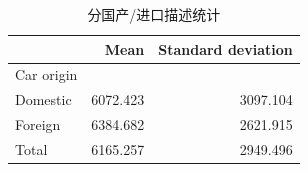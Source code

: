 \begin{table}[htbp]
  \centering
  \caption{ 分国产/进口描述统计 }
  \label{tab:statby}
  \small
  \begin{tabular}{lll}
    \toprule
    \multicolumn{1}{c}{} &
      \multicolumn{1}{r}{Mean} &
      \multicolumn{1}{r}{Standard deviation} \\
    \midrule
    \multicolumn{1}{l}{Car origin} &
      \multicolumn{1}{r}{} &
      \multicolumn{1}{r}{} \\
    \multicolumn{1}{l}{\hspace{1em}Domestic} &
      \multicolumn{1}{r}{6072.423} &
      \multicolumn{1}{r}{3097.104} \\
    \multicolumn{1}{l}{\hspace{1em}Foreign} &
      \multicolumn{1}{r}{6384.682} &
      \multicolumn{1}{r}{2621.915} \\
    \multicolumn{1}{l}{\hspace{1em}Total} &
      \multicolumn{1}{r}{6165.257} &
      \multicolumn{1}{r}{2949.496} \\
    \bottomrule
  \end{tabular}
\end{table}
